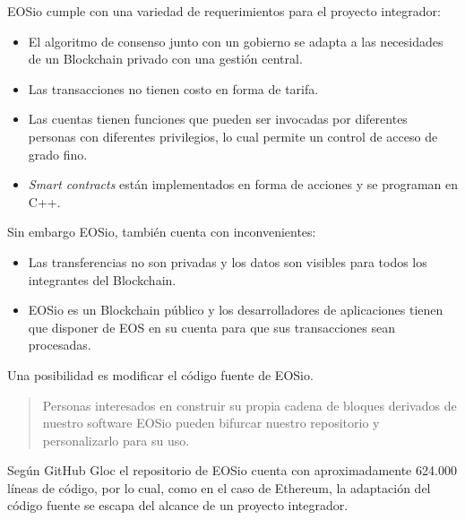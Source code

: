 EOSio cumple con una variedad de requerimientos para el proyecto integrador:
\begin{itemize}

\item El algoritmo de consenso junto con un gobierno se adapta a las necesidades de un Blockchain privado con una gestión central.
\item Las transacciones no tienen costo en forma de tarifa.
\item Las cuentas tienen funciones que pueden ser invocadas por diferentes personas con diferentes privilegios, lo cual permite un control de acceso de grado fino.
\item \textit{Smart contracts} están implementados en forma de acciones y se programan en C++.
\end{itemize}

Sin embargo EOSio, también cuenta con inconvenientes:
\begin{itemize}
\item Las transferencias no son privadas y los datos son visibles para todos los integrantes del Blockchain.
\item EOSio es un Blockchain público y los desarrolladores de aplicaciones tienen que disponer de EOS en su cuenta para que sus transacciones sean procesadas.
\end{itemize}


Una posibilidad es modificar el código fuente de EOSio.
\begin{quote} 
Personas interesados en construir su propia cadena de bloques derivados de nuestro software EOSio pueden bifurcar nuestro repositorio y personalizarlo para su uso.\cite{eosio_faq}
\end{quote}
Según GitHub Gloc el repositorio de EOSio cuenta con aproximadamente 624.000 líneas de código, por lo cual, como en el caso de Ethereum, la adaptación del código fuente se escapa del alcance de un proyecto integrador.

